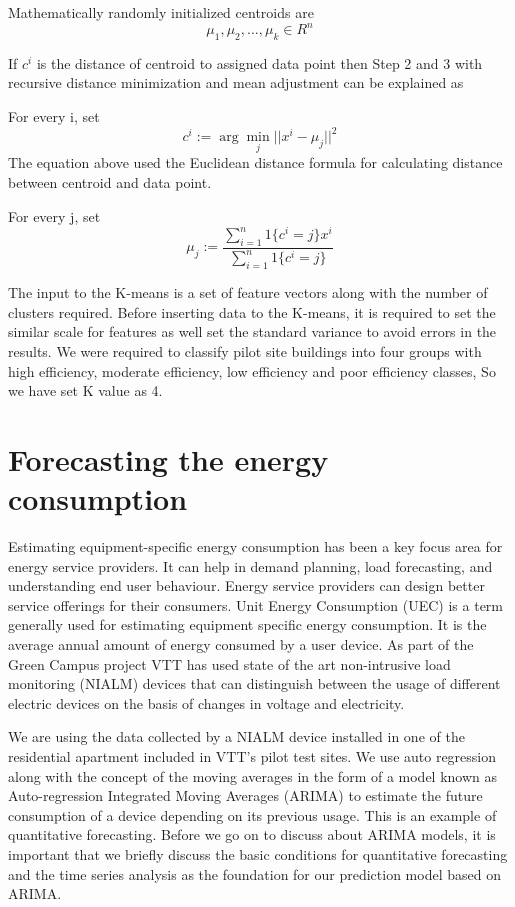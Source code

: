 Mathematically randomly initialized centroids are  
$${\mu_1,\mu_2,\dotsc,\mu_k}  \in R^{n}$$


If \(c^{i}\) is the distance of centroid to assigned data point then Step 2 and 3 with recursive distance minimization and mean adjustment can be explained as 

For every i, set 
\begin{equation}
c^{i} := \arg\min_j || x^{i} - \mu_j||^2
\end{equation} 
The equation above used the Euclidean distance formula for calculating distance between centroid and data point. 

For every j, set
\begin{equation}
\mu_{j} := \frac{\sum\limits_{i=1}^n 1\{c^{i} =j\}x^{i}}{\sum\limits_{i=1}^n 1\{c^{i}=j\}}
\end{equation}

The input to the K-means is a set of feature vectors along with the number of clusters required. Before inserting data to the K-means, it is required to set the similar scale for features as well set the standard variance to avoid errors in the results. We were required to classify pilot site buildings into four groups with high efficiency, moderate efficiency, low efficiency and poor efficiency classes, So we have set K value as 4.

\section{Forecasting the energy consumption}\label{predict}
Estimating equipment-specific energy consumption has been a key focus area for energy service providers. It can help in demand planning, load forecasting, and understanding end user behaviour.  Energy service providers can design better service offerings for their consumers. Unit Energy Consumption (UEC) is a term generally used for estimating equipment specific energy consumption. It is the average annual amount of energy consumed by a user device. As part of the Green Campus project VTT has used state of the art non-intrusive load monitoring (NIALM) \cite{hart1992nonintrusive} devices that can distinguish between the usage of different electric devices on the basis of changes in voltage and electricity. 

We are using the data collected by a NIALM device installed in one of the residential apartment included in VTT's pilot test sites. We use auto regression along with the concept of the moving averages in the form of a model known as Auto-regression Integrated Moving Averages (ARIMA) to estimate the future consumption of a device depending on its previous usage. This is an example of quantitative forecasting. Before we go on to discuss about ARIMA models, it is important that we briefly discuss the basic conditions for quantitative forecasting and the time series analysis as the foundation for our prediction model based on ARIMA.
